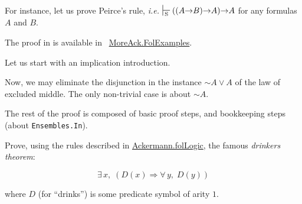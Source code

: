 For instance, let us prove Peirce's rule, \emph{i.e.}
$\sdash ((A \arrow B) \arrow A) \arrow A$ for any formulas $A$ and $B$.

 The proof in \coq is available in  ~\href{../theories/html/hydras.MoreAck.FolExamples.html}{MoreAck.FolExamples}.


Let us start with  an implication introduction.


Now, we may eliminate the disjunction 
in the instance $\sim A \vee A$ of the law of excluded middle.
The only non-trivial case is about $\sim A$.


The rest of the proof is composed of basic proof steps, 
and bookkeeping steps (about \texttt{Ensembles.In}).


\begin{exercise}
Prove, using the rules described in 
 \href{../theories/html/hydras.Ackermann.folLogic.html}{Ackermann.folLogic}, the famous \emph{drinkers theorem}:

$$\exists\,x,\; (D(x)\Longrightarrow \forall\,y,\; D(y))$$
\end{exercise}

where $D$ (for ``drinks'') is some predicate symbol of arity $1$.


